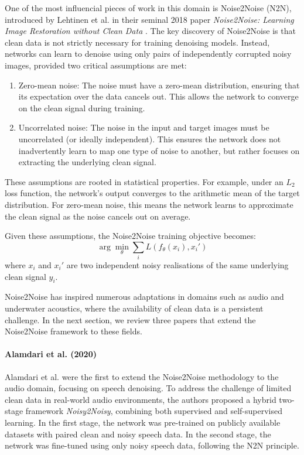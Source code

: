 One of the most influencial pieces of work in this domain is Noise2Noise (N2N), introduced by Lehtinen et al. in their seminal 2018 paper \textit{Noise2Noise: Learning Image Restoration without Clean Data} \cite{lehtinen_noise2noise_2018}. The key discovery of Noise2Noise is that clean data is not strictly necessary for training denoising models. Instead, networks can learn to denoise using only pairs of independently corrupted noisy images, provided two critical assumptions are met:
\begin{enumerate}
    \item Zero-mean noise: The noise must have a zero-mean distribution, ensuring that its expectation over the data cancels out. This allows the network to converge on the clean signal during training.
    \item Uncorrelated noise: The noise in the input and target images must be uncorrelated (or ideally independent). This ensures the network does not inadvertently learn to map one type of noise to another, but rather focuses on extracting the underlying clean signal.
\end{enumerate}
These assumptions are rooted in statistical properties. For example, under an $L_2$ loss function, the network's output converges to the arithmetic mean of the target distribution. For zero-mean noise, this means the network learns to approximate the clean signal as the noise cancels out on average. %

Given these assumptions, the Noise2Noise training objective becomes:
\begin{equation}
    \arg \min_\theta \sum_i L(f_\theta (x_i), x_i')
\end{equation}
where $x_i$ and $x_i'$ are two independent noisy realisations of the same underlying clean signal $y_i$.

Noise2Noise has inspired numerous adaptations in domains such as audio and underwater acoustics, where the availability of clean data is a persistent challenge. In the next section, we review three papers that extend the Noise2Noise framework to these fields.

\paragraph{Alamdari et al. (2020)}

Alamdari et al. \cite{alamdari_improving_2020} were the first to extend the Noise2Noise methodology to the audio domain, focusing on speech denoising. To address the challenge of limited clean data in real-world audio environments, the authors proposed a hybrid two-stage framework \textit{Noisy2Noisy}, combining both supervised and self-supervised learning. In the first stage, the network was pre-trained on publicly available datasets with paired clean and noisy speech data. In the second stage, the network was fine-tuned using only noisy speech data, following the N2N principle.

